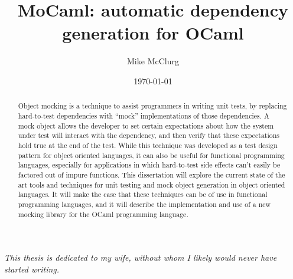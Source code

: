 \documentclass[dissertation]{softeng}
\title{MoCaml: automatic dependency generation for OCaml}
\author{Mike McClurg}
\date{\today}
\begin{document}
\maketitle

\begin{abstract}

  Object mocking is a technique to assist programmers in writing unit
  tests, by replacing hard-to-test dependencies with ``mock''
  implementations of those dependencies. A mock object allows the
  developer to set certain expectations about how the system under
  test will interact with the dependency, and then verify that these
  expectations hold true at the end of the test. While this technique
  was developed as a test design pattern for object oriented
  languages, it can also be useful for functional programming
  languages, especially for applications in which hard-to-test side
  effects can't easily be factored out of impure functions. This
  dissertation will explore the current state of the art tools and
  techniques for unit testing and mock object generation in object
  oriented languages. It will make the case that these techniques can
  be of use in functional programming languages, and it will describe
  the implementation and use of a new mocking library for the OCaml
  programming language.


\end{abstract}

\newpage


\vspace*{\fill}
\begin{centering}
  \textit{This thesis is dedicated to my wife, without whom I likely
    would never have started writing.}
\end{centering}
\vspace*{\fill}

\newpage

\tableofcontents

\newpage

\listoffigures








\end{document}
